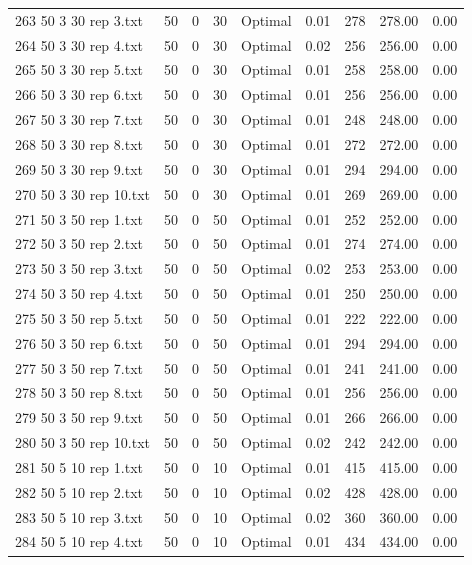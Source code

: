 \begin{longtable}{lrrllrrrr}
263 50 3 30 rep 3.txt & 50 & 0 & 30 & Optimal &  0.01 & 278 & 278.00 &  0.00\\
264 50 3 30 rep 4.txt & 50 & 0 & 30 & Optimal &  0.02 & 256 & 256.00 &  0.00\\
265 50 3 30 rep 5.txt & 50 & 0 & 30 & Optimal &  0.01 & 258 & 258.00 &  0.00\\
266 50 3 30 rep 6.txt & 50 & 0 & 30 & Optimal &  0.01 & 256 & 256.00 &  0.00\\
267 50 3 30 rep 7.txt & 50 & 0 & 30 & Optimal &  0.01 & 248 & 248.00 &  0.00\\
268 50 3 30 rep 8.txt & 50 & 0 & 30 & Optimal &  0.01 & 272 & 272.00 &  0.00\\
269 50 3 30 rep 9.txt & 50 & 0 & 30 & Optimal &  0.01 & 294 & 294.00 &  0.00\\
270 50 3 30 rep 10.txt & 50 & 0 & 30 & Optimal &  0.01 & 269 & 269.00 &  0.00\\
271 50 3 50 rep 1.txt & 50 & 0 & 50 & Optimal &  0.01 & 252 & 252.00 &  0.00\\
272 50 3 50 rep 2.txt & 50 & 0 & 50 & Optimal &  0.01 & 274 & 274.00 &  0.00\\
273 50 3 50 rep 3.txt & 50 & 0 & 50 & Optimal &  0.02 & 253 & 253.00 &  0.00\\
274 50 3 50 rep 4.txt & 50 & 0 & 50 & Optimal &  0.01 & 250 & 250.00 &  0.00\\
275 50 3 50 rep 5.txt & 50 & 0 & 50 & Optimal &  0.01 & 222 & 222.00 &  0.00\\
276 50 3 50 rep 6.txt & 50 & 0 & 50 & Optimal &  0.01 & 294 & 294.00 &  0.00\\
277 50 3 50 rep 7.txt & 50 & 0 & 50 & Optimal &  0.01 & 241 & 241.00 &  0.00\\
278 50 3 50 rep 8.txt & 50 & 0 & 50 & Optimal &  0.01 & 256 & 256.00 &  0.00\\
279 50 3 50 rep 9.txt & 50 & 0 & 50 & Optimal &  0.01 & 266 & 266.00 &  0.00\\
280 50 3 50 rep 10.txt & 50 & 0 & 50 & Optimal &  0.02 & 242 & 242.00 &  0.00\\
281 50 5 10 rep 1.txt & 50 & 0 & 10 & Optimal &  0.01 & 415 & 415.00 &  0.00\\
282 50 5 10 rep 2.txt & 50 & 0 & 10 & Optimal &  0.02 & 428 & 428.00 &  0.00\\
283 50 5 10 rep 3.txt & 50 & 0 & 10 & Optimal &  0.02 & 360 & 360.00 &  0.00\\
284 50 5 10 rep 4.txt & 50 & 0 & 10 & Optimal &  0.01 & 434 & 434.00 &  0.00\\

\end{longtable}
